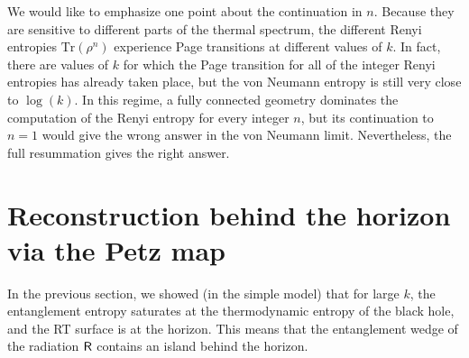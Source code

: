 \documentclass[11pt]{article}
\newcommand{\be}{\begin{equation}}
\newcommand{\ee}{\end{equation}}
\numberwithin{equation}{section}
\def\tr{\text{Tr}}
\begin{document}
We would like to emphasize one point about the continuation in $n$. Because they are sensitive to different parts of the thermal spectrum, the different Renyi entropies $\tr(\rho^n)$ experience Page transitions at different values of $k$. In fact, there are values of $k$ for which the Page transition for all of the integer Renyi entropies has already taken place, but the von Neumann entropy is still very close to $\log(k)$. In this regime, a fully connected geometry dominates the computation of the Renyi entropy for every integer $n$, but its continuation to $n = 1$ would give the wrong answer in the von Neumann limit. Nevertheless, the full resummation gives the right answer.








\section{Reconstruction behind the horizon via the Petz map}\label{sec:petz}
In the previous section, we showed (in the simple model) that for large $k$, the entanglement entropy saturates at the thermodynamic entropy of the black hole, and the RT surface is at the horizon. This means that the entanglement wedge of the radiation $\sf{R}$ contains an island behind the horizon.
\end{document}
